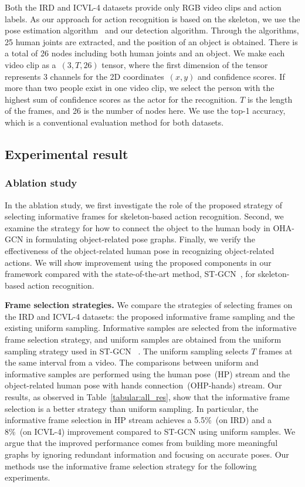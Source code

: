\documentclass[10pt,twocolumn,letterpaper]{article}
\begin{document}
Both the IRD and ICVL-4 datasets provide only RGB video clips and action labels.
As our approach for action recognition is based on the skeleton, we use the pose estimation algorithm~\cite{cao2017realtime} and our detection algorithm.
Through the algorithms, 25 human joints are extracted, and the position of an object is obtained. There is a total of 26 nodes including both human joints and an object.
We make each video clip as a~$(3 ,T ,26)$ tensor, where the first dimension of the tensor represents 3 channels for the 2D coordinates~$(x, y)$ and confidence scores.
If more than two people exist in one video clip, we select the person with the highest sum of confidence scores as the actor for the recognition.
$T$ is the length of the frames, and 26 is the number of nodes here.
We use the top-1 accuracy, which is a conventional evaluation method for both datasets.
\subsection{Experimental result}
\subsubsection{Ablation study}
\label{sec:ablation}
\quad In the ablation study, we first investigate the role of 
the proposed strategy of selecting informative frames for skeleton-based action recognition. Second, we examine the strategy for how to connect the object to the human body in OHA-GCN in formulating object-related pose graphs.
Finally, we verify the effectiveness of the object-related human pose in recognizing object-related actions. 
We will show improvement using the proposed components in our framework compared with the state-of-the-art method, ST-GCN~\cite{stgcn2018aaai}, for skeleton-based action recognition.

\textbf{Frame selection strategies.} 
We compare the strategies of selecting frames on the IRD and ICVL-4 datasets: the proposed informative frame sampling and the existing uniform sampling.
Informative samples are selected from the informative frame selection strategy, and uniform samples are obtained from the uniform sampling strategy used in ST-GCN ~\cite{stgcn2018aaai}.
The uniform sampling selects $T$ frames at the same interval from a video.
The comparisons between uniform and informative samples are performed using the human pose~(HP) stream and the object-related human pose with hands connection~(OHP-hands) stream.
Our results, as observed in Table~\ref{tabular:all_res}, show that the informative frame selection is a better strategy than uniform sampling. 
In particular, the informative frame selection in HP stream achieves a 5.5\%~(on IRD) and a 8\%~(on ICVL-4)  improvement compared to ST-GCN using uniform samples.
We argue that the improved performance comes from building more meaningful graphs by ignoring redundant information and focusing on accurate poses.
Our methods use the informative frame selection strategy for the following experiments.
\end{document}
